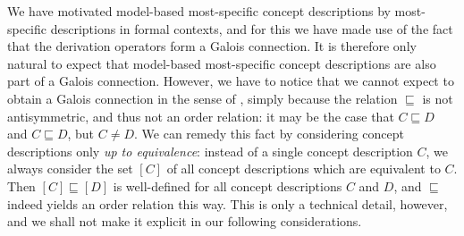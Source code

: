 We have motivated model-based most-specific concept descriptions by most-specific
descriptions in formal contexts, and for this we have made use of the fact that the
derivation operators form a Galois connection.  It is therefore only natural to expect
that model-based most-specific concept descriptions are also part of a Galois connection.
However, we have to notice that we cannot expect to obtain a Galois connection in the
sense of , simply because the relation $\sqsubseteq$ is not
antisymmetric, and thus not an order relation: it may be the case that $C \sqsubseteq D$
and $C \sqsubseteq D$, but $C \neq D$.  We can remedy this fact by considering concept
descriptions only \emph{up to equivalence}: instead of a single concept description $C$,
we always consider the set $[C]$ of all concept descriptions which are equivalent to $C$.
Then $[C] \sqsubseteq [D]$ is well-defined for all concept descriptions $C$ and $D$, and
$\sqsubseteq$ indeed yields an order relation this way.  This is only a technical detail,
however, and we shall not make it explicit in our following considerations.

